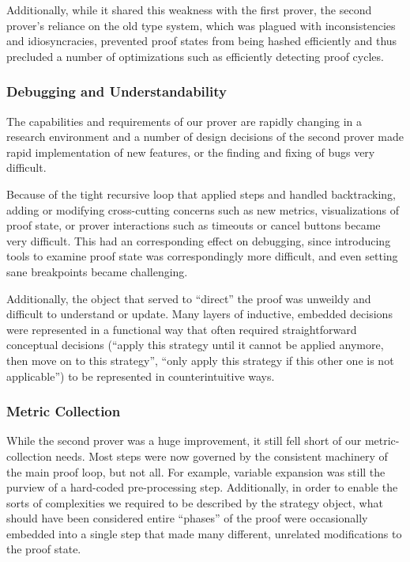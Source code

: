 Additionally, while it shared this weakness with the first prover, the second prover's reliance on the old type system, which was plagued with inconsistencies and idiosyncracies, prevented proof states from being hashed efficiently and thus precluded a number of optimizations such as efficiently detecting proof cycles.

		\subsubsection{Debugging and Understandability}

The capabilities and requirements of our prover are rapidly changing in a research environment and a number of design decisions of the second prover made rapid implementation of new features, or the finding and fixing of bugs very difficult.

Because of the tight recursive loop that applied steps and handled backtracking, adding or modifying cross-cutting concerns such as new metrics, visualizations of proof state, or prover interactions such as timeouts or cancel buttons became very difficult.  This had an corresponding effect on debugging, since introducing tools to examine proof state was correspondingly more difficult, and even setting sane breakpoints became challenging.

Additionally, the object that served to ``direct'' the proof was unweildy and difficult to understand or update.  Many layers of inductive, embedded decisions were represented in a functional way that often required straightforward conceptual decisions (``apply this strategy until it cannot be applied anymore, then move on to this strategy'', ``only apply this strategy if this other one is not applicable'') to be represented in counterintuitive ways.

		\subsubsection{Metric Collection}

While the second prover was a huge improvement, it still fell short of our metric-collection needs.  Most steps were now governed by the consistent machinery of the main proof loop, but not all.  For example, variable expansion was still the purview of a hard-coded pre-processing step.  Additionally, in order to enable the sorts of complexities we required to be described by the strategy object, what should have been considered entire ``phases'' of the proof were occasionally embedded into a single step that made many different, unrelated modifications to the proof state.

